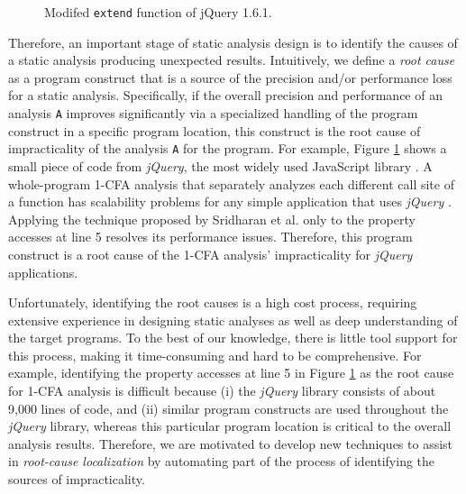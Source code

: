 

\begin{figure}[th!]
        
\caption{\textmd{Modifed {\tt extend} function of jQuery 1.6.1.}}
\label{fig:jquery-modified}
\end{figure}

Therefore, an important stage of static analysis design is to identify the causes of a static analysis producing unexpected results. Intuitively, we define a {\it root cause} as a program construct that is a source of the precision and/or performance loss for a static analysis. Specifically, if the overall precision and performance of an analysis {\tt A} improves significantly via a specialized handling of the program construct in a specific program location, this construct is the root cause of impracticality of the analysis {\tt A} for the program. For example, Figure \ref{fig:jquery-modified} shows a small piece of code from {\it jQuery}, the most widely used JavaScript library \cite{LibraryUsage}. A whole-program 1-CFA analysis \cite{Shivers:1991:CAH:124950} that separately analyzes each different call site of a function has scalability problems for any simple application that uses {\it jQuery} \cite{Sridharan:2012:CTP:2367163.2367191}. Applying the technique proposed by Sridharan et al. \cite{Sridharan:2012:CTP:2367163.2367191} only to the property accesses at line 5 resolves its performance issues. Therefore, this program construct is a root cause of the 1-CFA analysis' impracticality for {\it jQuery} applications.

Unfortunately, identifying the root causes is a high cost process, requiring extensive experience in designing static analyses as well as deep understanding of the target programs. To the best of our knowledge, there is little tool support for this process, making it time-consuming and hard to be comprehensive. For example, identifying the property accesses at line 5 in Figure \ref{fig:jquery-modified} as the root cause for 1-CFA analysis is difficult because (i) the {\it jQuery} library consists of about 9,000 lines of code, and (ii) similar program constructs are used throughout the {\it jQuery} library, whereas this particular program location is critical to the overall analysis results. Therefore, we are motivated to develop new techniques to assist in {\it root-cause localization} by automating part of the process of identifying the sources of impracticality.

